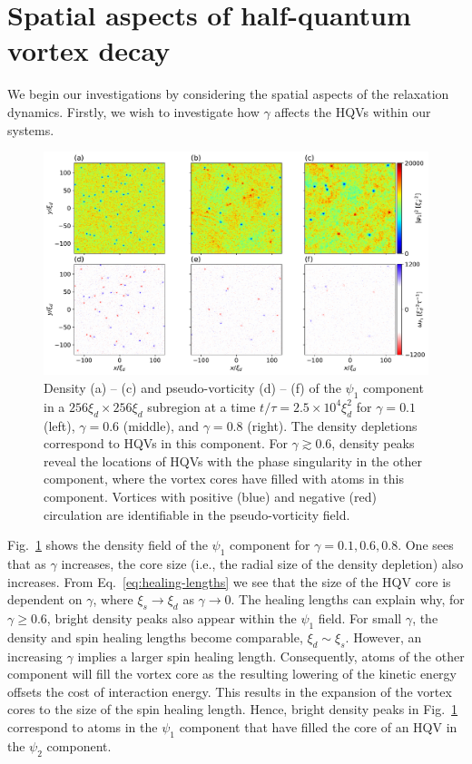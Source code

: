 \section{Spatial aspects of half-quantum vortex decay}
We begin our investigations by considering the spatial aspects of the
relaxation dynamics.
Firstly, we wish to investigate how \(\gamma \) affects the HQVs within our
systems.
\begin{figure}
    \centering
    \includegraphics[width=\textwidth]{gfx/ch-twoCompDynamics/densVort.pdf}
    \caption[Density and pseudo-vorticity of a system during relaxation dynamics
    for various ratios of inter- to intra-species interaction.]
    {\label{fig:density-pseudo-vort}Density (a) {--} (c) and pseudo-vorticity
        (d) {--} (f) of the \(\psi_1 \) component in a
        \(256\xi_d \times 256\xi_d\) subregion at a time
        \(t/\tau=2.5\times 10^4\xi_d^2\) for \(\gamma=0.1\) (left),
        \(\gamma=0.6\) (middle), and \(\gamma=0.8\) (right).
        The density depletions correspond to HQVs in this component.
        For \(\gamma \gtrsim 0.6\), density peaks reveal the locations of HQVs
        with the phase singularity in the other component, where the vortex
        cores have filled with atoms in this component.
        Vortices with positive (blue) and negative (red) circulation are
        identifiable in the pseudo-vorticity field.}
\end{figure}
Fig.~\ref{fig:density-pseudo-vort} shows the density field of the \(\psi_1 \)
component for \(\gamma = 0.1, 0.6, 0.8\).
One sees that as \(\gamma \) increases, the core size (i.e., the radial size of
the density depletion) also increases.
From Eq.~\eqref{eq:healing-lengths} we see that the size of the HQV core is
dependent on \(\gamma \), where \(\xi_s \rightarrow \xi_d\) as
\(\gamma \rightarrow 0\).
The healing lengths can explain why, for \(\gamma \geq 0.6\), bright density
peaks also appear within the \(\psi_1 \) field.
For small \(\gamma \), the density and spin healing lengths become comparable,
\(\xi_d \sim \xi_s\).
However, an increasing \(\gamma \) implies a larger spin healing length.
Consequently, atoms of the other component will fill the vortex core as the
resulting lowering of the kinetic energy offsets the cost of interaction energy.
This results in the expansion of the vortex cores to the size of the spin
healing length.
Hence, bright density peaks in Fig.~\ref{fig:density-pseudo-vort} correspond to
atoms in the \(\psi_1 \) component that have filled the core of an HQV in the
\(\psi_2\) component.

